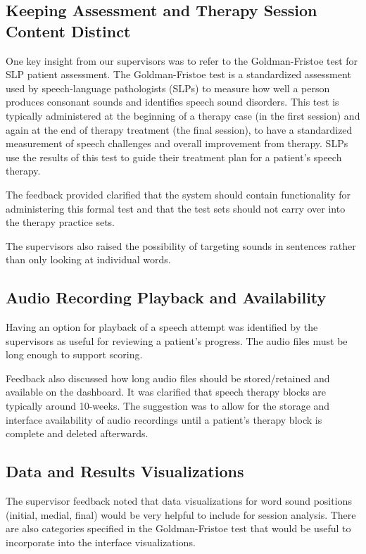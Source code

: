 \documentclass{article}
\begin{document}
\subsection{Keeping Assessment and Therapy Session Content Distinct}

One key insight from our supervisors was to refer to the Goldman-Fristoe test for SLP patient assessment. The Goldman-Fristoe test is a standardized assessment used by speech-language pathologists (SLPs) to measure how well a person produces consonant sounds and identifies speech sound disorders. This test is typically administered at the beginning of a therapy case (in the first session) and again at the end of therapy treatment (the final session), to have a standardized measurement of speech challenges and overall improvement from therapy. SLPs use the results of this test to guide their treatment plan for a patient's speech therapy.

The feedback provided clarified that the system should contain functionality for administering this formal test and that the test sets should not carry over into the therapy practice sets.

The supervisors also raised the possibility of targeting sounds in sentences rather than only looking at individual words.

\subsection{Audio Recording Playback and Availability}

Having an option for playback of a speech attempt was identified by the supervisors as useful for reviewing a patient's progress. The audio files must be long enough to support scoring.

Feedback also discussed how long audio files should be stored/retained and available on the dashboard. It was clarified that speech therapy blocks are typically around 10-weeks. The suggestion was to allow for the storage and interface availability of audio recordings until a patient's therapy block is complete and deleted afterwards.

\subsection{Data and Results Visualizations}

The supervisor feedback noted that data visualizations for word sound positions (initial, medial, final) would be very helpful to include for session analysis. There are also categories specified in the Goldman-Fristoe test that would be useful to incorporate into the interface visualizations.
\end{document}
